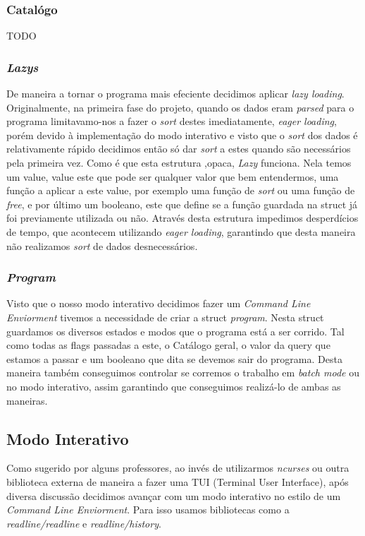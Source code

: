 \documentclass{article}
\begin{document}
        \subsubsection{Catalógo}
            TODO
        \subsubsection{\emph{Lazys}}
            De maneira a tornar o programa mais efeciente decidimos aplicar 
            \emph{lazy loading}. Originalmente, na primeira fase do projeto,
            quando os dados eram \emph{parsed} para o programa limitavamo-nos a 
            fazer o \emph{sort} destes imediatamente, \emph{eager loading}, porém devido
            à implementação do modo interativo e visto que o \emph{sort} dos dados é relativamente rápido
            decidimos então só dar \emph{sort} a estes quando são necessários pela primeira vez.
            Como é que esta estrutura ,opaca, \emph{Lazy} funciona. Nela temos um
            value, value este que pode ser qualquer valor que bem entendermos, uma função a aplicar a este
            value, por exemplo uma função de \emph{sort} ou uma função de \emph{free}, e por último
            um booleano, este que define se a função guardada na struct já foi previamente utilizada ou
            não. Através desta estrutura impedimos desperdícios de tempo, que acontecem utilizando \emph{eager
            loading}, garantindo que desta maneira não realizamos \emph{sort} de dados desnecessários.
        \subsubsection{\emph{Program}}
            Visto que o nosso modo interativo decidimos fazer um \emph{Command Line Enviorment} tivemos a necessidade de criar a struct \emph{program}. Nesta struct guardamos os diversos estados e modos
            que o programa está a ser corrido. Tal como todas as flags passadas a este, o Catálogo geral, o valor
            da query que estamos a passar e um booleano que dita se devemos sair do programa. Desta maneira também conseguimos controlar se corremos o trabalho em \emph{batch mode} ou no modo interativo, assim garantindo que conseguimos realizá-lo de ambas as maneiras.
    \subsection{Modo Interativo}
            Como sugerido por alguns professores, ao invés de utilizarmos \emph{ncurses} ou outra biblioteca externa de maneira a fazer uma TUI (Terminal User Interface), após diversa discussão decidimos avançar com um modo interativo no estilo de um \emph{Command Line Enviorment}. Para isso usamos bibliotecas como a \emph{readline/readline} e \emph{readline/history}. 
\end{document}
